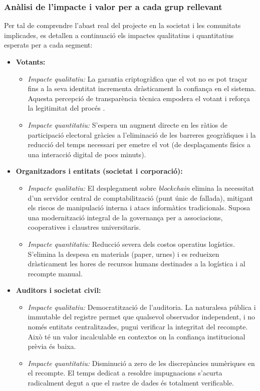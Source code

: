 \documentclass[12pt,a4paper,catalan]{article}
\begin{document}
\subsubsection{Anàlisi de l'impacte i valor per a cada grup rellevant}

Per tal de comprendre l'abast real del projecte en la societat i les comunitats implicades, es detallen a continuació els impactes qualitatius i quantitatius esperats per a cada segment:

\begin{itemize}
    
    \item \textbf{Votants:}
    \begin{itemize}
        \item \textit{Impacte qualitatiu:} La garantia criptogràfica que el vot no es pot traçar fins a la seva identitat incrementa dràsticament la confiança en el sistema. Aquesta percepció de transparència tècnica empodera el votant i reforça la legitimitat del procés \cite{mannonov2024}.
        \item \textit{Impacte quantitatiu:} S'espera un augment directe en les ràtios de participació electoral gràcies a l'eliminació de les barreres geogràfiques i la reducció del temps necessari per emetre el vot (de desplaçaments físics a una interacció digital de pocs minuts).
    \end{itemize}

    \item \textbf{Organitzadors i entitats (societat i corporació):}
    \begin{itemize}
        \item \textit{Impacte qualitatiu:} El desplegament sobre \textit{blockchain} elimina la necessitat d'un servidor central de comptabilització (punt únic de fallada), mitigant els riscos de manipulació interna i atacs informàtics tradicionals. Suposa una modernització integral de la governança per a associacions, cooperatives i claustres universitaris.
        \item \textit{Impacte quantitatiu:} Reducció severa dels costos operatius logístics. S'elimina la despesa en materials (paper, urnes) i es redueixen dràsticament les hores de recursos humans destinades a la logística i al recompte manual.
    \end{itemize}

    \item \textbf{Auditors i societat civil:}
    \begin{itemize}
        \item \textit{Impacte qualitatiu:} Democratització de l'auditoria. La naturalesa pública i immutable del registre permet que qualsevol observador independent, i no només entitats centralitzades, pugui verificar la integritat del recompte. Això té un valor incalculable en contextos on la confiança institucional prèvia és baixa.
        \item \textit{Impacte quantitatiu:} Disminució a zero de les discrepàncies numèriques en el recompte. El temps dedicat a resoldre impugnacions s'acurta radicalment degut a que el rastre de dades és totalment verificable.
    \end{itemize}


\end{itemize}
\end{document}
